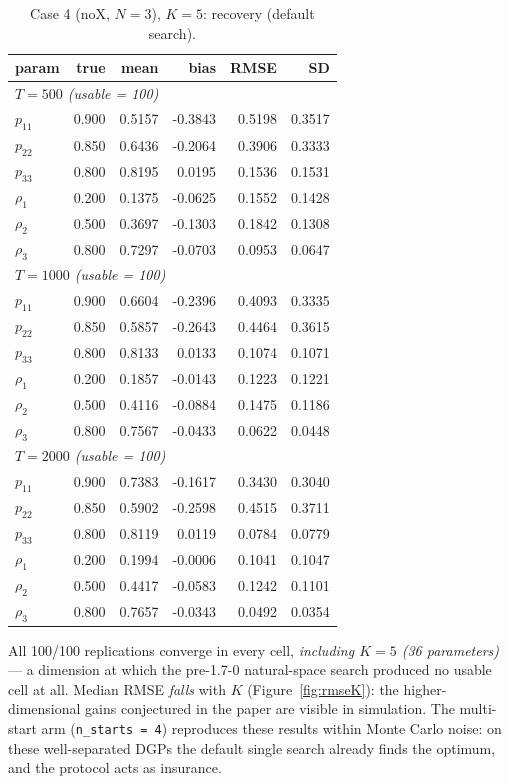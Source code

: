 \documentclass[11pt]{article}
\begin{document}
\begin{table}[!htbp]\centering\small
\caption{Case 4 (noX, $N=3$), $K = 5$: recovery (default search).}\label{tab:c4k5}
\begin{tabular}{lrrrrr}
\toprule
param & true & mean & bias & RMSE & SD\\
\midrule\multicolumn{6}{l}{\emph{$T = 500$ (usable = 100)}}\\
$p_{11}$ & 0.900 & 0.5157 & -0.3843 & 0.5198 & 0.3517\\
$p_{22}$ & 0.850 & 0.6436 & -0.2064 & 0.3906 & 0.3333\\
$p_{33}$ & 0.800 & 0.8195 & 0.0195 & 0.1536 & 0.1531\\
$\rho_1$ & 0.200 & 0.1375 & -0.0625 & 0.1552 & 0.1428\\
$\rho_2$ & 0.500 & 0.3697 & -0.1303 & 0.1842 & 0.1308\\
$\rho_3$ & 0.800 & 0.7297 & -0.0703 & 0.0953 & 0.0647\\
\midrule\multicolumn{6}{l}{\emph{$T = 1000$ (usable = 100)}}\\
$p_{11}$ & 0.900 & 0.6604 & -0.2396 & 0.4093 & 0.3335\\
$p_{22}$ & 0.850 & 0.5857 & -0.2643 & 0.4464 & 0.3615\\
$p_{33}$ & 0.800 & 0.8133 & 0.0133 & 0.1074 & 0.1071\\
$\rho_1$ & 0.200 & 0.1857 & -0.0143 & 0.1223 & 0.1221\\
$\rho_2$ & 0.500 & 0.4116 & -0.0884 & 0.1475 & 0.1186\\
$\rho_3$ & 0.800 & 0.7567 & -0.0433 & 0.0622 & 0.0448\\
\midrule\multicolumn{6}{l}{\emph{$T = 2000$ (usable = 100)}}\\
$p_{11}$ & 0.900 & 0.7383 & -0.1617 & 0.3430 & 0.3040\\
$p_{22}$ & 0.850 & 0.5902 & -0.2598 & 0.4515 & 0.3711\\
$p_{33}$ & 0.800 & 0.8119 & 0.0119 & 0.0784 & 0.0779\\
$\rho_1$ & 0.200 & 0.1994 & -0.0006 & 0.1041 & 0.1047\\
$\rho_2$ & 0.500 & 0.4417 & -0.0583 & 0.1242 & 0.1101\\
$\rho_3$ & 0.800 & 0.7657 & -0.0343 & 0.0492 & 0.0354\\
\bottomrule
\end{tabular}
\end{table}
All 100/100 replications converge in every cell, \emph{including $K = 5$
(36 parameters)} --- a dimension at which the pre-1.7-0 natural-space
search produced no usable cell at all. Median RMSE \emph{falls} with $K$
(Figure~\ref{fig:rmseK}): the higher-dimensional gains conjectured in the
paper are visible in simulation. The multi-start arm
(\texttt{n\_starts = 4}) reproduces these results within Monte Carlo
noise: on these well-separated DGPs the default single search already
finds the optimum, and the protocol acts as insurance.
\end{document}
